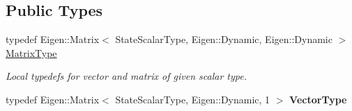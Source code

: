 \subsection*{Public Types}
\begin{DoxyCompactItemize}
\item 
typedef Eigen\+::\+Matrix$<$ State\+Scalar\+Type, Eigen\+::\+Dynamic, Eigen\+::\+Dynamic $>$ \hyperlink{classtudat_1_1propagators_1_1SingleArcVariationalEquationsSolver_a0d859514ec4757ffea31c36ebea1e3a0}{Matrix\+Type}\hypertarget{classtudat_1_1propagators_1_1SingleArcVariationalEquationsSolver_a0d859514ec4757ffea31c36ebea1e3a0}{}\label{classtudat_1_1propagators_1_1SingleArcVariationalEquationsSolver_a0d859514ec4757ffea31c36ebea1e3a0}

\begin{DoxyCompactList}\small\item\em Local typedefs for vector and matrix of given scalar type. \end{DoxyCompactList}\item 
typedef Eigen\+::\+Matrix$<$ State\+Scalar\+Type, Eigen\+::\+Dynamic, 1 $>$ {\bfseries Vector\+Type}\hypertarget{classtudat_1_1propagators_1_1SingleArcVariationalEquationsSolver_a244124d8be3a1e6c1ef90776db7f5be4}{}\label{classtudat_1_1propagators_1_1SingleArcVariationalEquationsSolver_a244124d8be3a1e6c1ef90776db7f5be4}

\end{DoxyCompactItemize}
